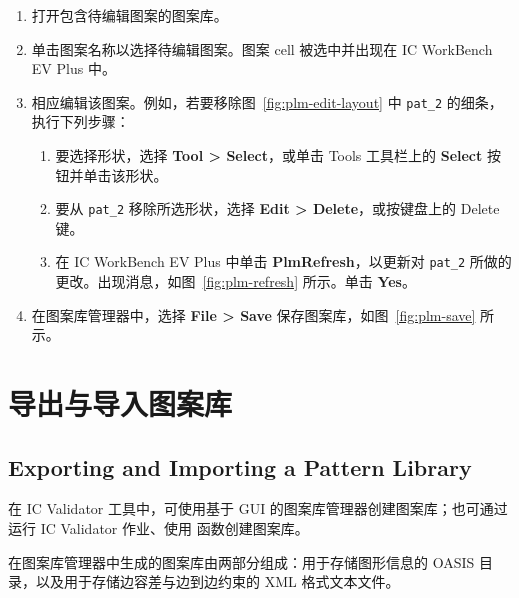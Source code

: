 \begin{enumerate}
  \item 打开包含待编辑图案的图案库。
  \item 单击图案名称以选择待编辑图案。图案 cell 被选中并出现在 IC WorkBench EV Plus 中。
  \item 相应编辑该图案。例如，若要移除图~\ref{fig:plm-edit-layout} 中 \texttt{pat\_2} 的细条，执行下列步骤：


  \begin{enumerate}[label=\alph*.]
    \item 要选择形状，选择 \textbf{Tool > Select}，或单击 Tools 工具栏上的 \textbf{Select} 按钮并单击该形状。
    \item 要从 \texttt{pat\_2} 移除所选形状，选择 \textbf{Edit > Delete}，或按键盘上的 Delete 键。
    \item 在 IC WorkBench EV Plus 中单击 \textbf{PlmRefresh}，以更新对 \texttt{pat\_2} 所做的更改。出现消息，如图~\ref{fig:plm-refresh} 所示。单击 \textbf{Yes}。
  \end{enumerate}


  \item 在图案库管理器中，选择 \textbf{File > Save} 保存图案库，如图~\ref{fig:plm-save} 所示。

\end{enumerate}

\section{导出与导入图案库}
\subsection*{Exporting and Importing a Pattern Library}

在 IC Validator 工具中，可使用基于 GUI 的图案库管理器创建图案库；也可通过运行 IC Validator 作业、使用  函数创建图案库。

在图案库管理器中生成的图案库由两部分组成：用于存储图形信息的 OASIS 目录，以及用于存储边容差与边到边约束的 XML 格式文本文件。

